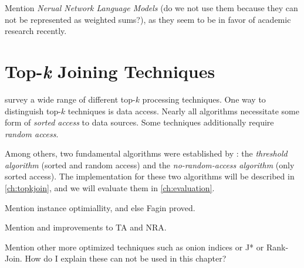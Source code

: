 \begin{draft}
Mention \emph{Nerual Network Language Models} \parencite{Bengio2003,Mikolov2012}
(do we not use them because they can not be represented as weighted sums?), as
they seem to be in favor of academic research recently.
\end{draft}

\section{Top-\emph{k} Joining Techniques}

\textcite{Ilyas2008} survey a wide range of different top-$k$ processing
techniques.
One way to distinguish top-$k$ techniques is data access.
Nearly all algorithms necessitate some form of \emph{sorted access} to data
sources.
Some techniques additionally require \emph{random access}.

Among others, two fundamental algorithms were established by
\textcite{Fagin2001}: the \emph{threshold algorithm} (sorted and random access)
and the \emph{no-random-access algorithm} (only sorted access).
The implementation for these two algorithms will be described in
\cref{ch:topkjoin}, and we will evaluate them in \cref{ch:evaluation}.

\begin{draft}
Mention instance optimiallity, and else Fagin proved.
\end{draft}


\begin{draft}
Mention \textcite{Guentzer2000} and \textcite{Guentzer2001} improvements to TA
and NRA.
\end{draft}

\begin{draft}
Mention other more optimized techniques such as onion indices or J* or
Rank-Join.
How do I explain these can not be used in this chapter?
\end{draft}
